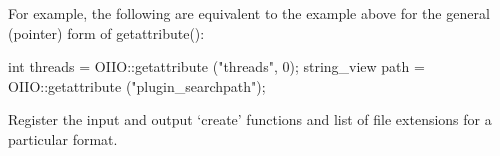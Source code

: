 For example, the following are equivalent to the example above for the
general (pointer) form of {\cf getattribute()}:

\begin{code}
      int threads = OIIO::getattribute ("threads", 0);
      string_view path = OIIO::getattribute ("plugin_searchpath");
\end{code}
\apiend


Register the input and output `create' functions and list of file extensions
for a particular format.
\apiend



\chapwidthend
